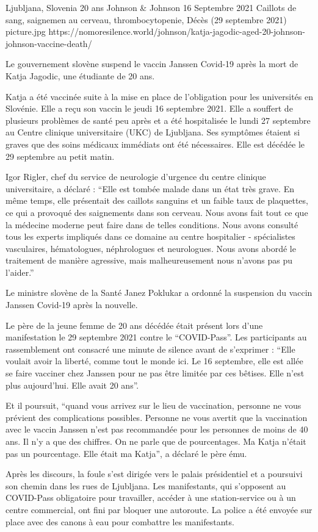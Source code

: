 {Ljubljana, Slovenia}
{20 ans}
{Johnson \& Johnson}
{16 Septembre 2021}
{Caillots de sang, saignemen au cerveau, thrombocytopenie, Décès (29 septembre 2021)}
{picture.jpg}
{https://nomoresilence.world/johnson/katja-jagodic-aged-20-johnson-johnson-vaccine-death/}
{

Le gouvernement slovène suspend le vaccin Janssen Covid-19 après la mort de
Katja Jagodic, une étudiante de 20 ans.

Katja a été vaccinée suite à la mise en place de l'obligation pour les
universités en Slovénie. Elle a reçu son vaccin le jeudi 16 septembre 2021. Elle
a souffert de plusieurs problèmes de santé peu après et a été hospitalisée le
lundi 27 septembre au Centre clinique universitaire (UKC) de Ljubljana. Ses
symptômes étaient si graves que des soins médicaux immédiats ont été
nécessaires. Elle est décédée le 29 septembre au petit matin.

Igor Rigler, chef du service de neurologie d'urgence du centre clinique
universitaire, a déclaré : “Elle est tombée malade dans un état très grave. En
même temps, elle présentait des caillots sanguins et un faible taux de
plaquettes, ce qui a provoqué des saignements dans son cerveau. Nous avons fait
tout ce que la médecine moderne peut faire dans de telles conditions. Nous avons
consulté tous les experts impliqués dans ce domaine au centre hospitalier -
spécialistes vasculaires, hématologues, néphrologues et neurologues. Nous avons
abordé le traitement de manière agressive, mais malheureusement nous n'avons pas
pu l'aider.”

Le ministre slovène de la Santé Janez Poklukar a ordonné la suspension du vaccin
Janssen Covid-19 après la nouvelle.

Le père de la jeune femme de 20 ans décédée était présent lors d'une
manifestation le 29 septembre 2021 contre le “COVID-Pass”. Les participants au
rassemblement ont consacré une minute de silence avant de s'exprimer : “Elle
voulait avoir la liberté, comme tout le monde ici. Le 16 septembre, elle est
allée se faire vacciner chez Janssen pour ne pas être limitée par ces
bêtises. Elle n'est plus aujourd'hui. Elle avait 20 ans”.

Et il poursuit, “quand vous arrivez sur le lieu de vaccination, personne ne vous
prévient des complications possibles. Personne ne vous avertit que la
vaccination avec le vaccin Janssen n'est pas recommandée pour les personnes de
moins de 40 ans. Il n'y a que des chiffres. On ne parle que de pourcentages. Ma
Katja n'était pas un pourcentage. Elle était ma Katja”, a déclaré le père ému.

Après les discours, la foule s'est dirigée vers le palais présidentiel et a
poursuivi son chemin dans les rues de Ljubljana. Les manifestants, qui
s'opposent au COVID-Pass obligatoire pour travailler, accéder à une
station-service ou à un centre commercial, ont fini par bloquer une
autoroute. La police a été envoyée sur place avec des canons à eau pour
combattre les manifestants.

}

